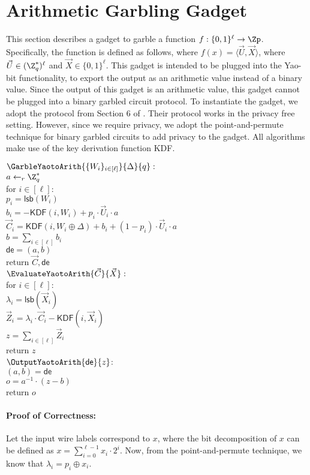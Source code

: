 \section{Arithmetic Garbling Gadget}

This section describes a gadget to garble a function $f: \{0,1\}^\ell \rightarrow \Zp$.  Specifically, the function is defined as follows, where $f(x) = \langle \vec{U}, \vec{X} \rangle$, where $\vec{U} \in (\Z_q^*)^\ell$ and $\vec{X} \in \{0,1\}^\ell$. This gadget is intended to be plugged into the Yao-bit functionality, to export the output as an arithmetic value instead of a binary value. Since the output of this gadget is an arithmetic value, this gadget cannot be plugged into a binary garbled circuit protocol. To instantiate the gadget, we adopt the protocol from Section 6 of \cite{C:GKMN21}. Their protocol works in the privacy free setting. However, since we require privacy, we adopt the point-and-permute technique for binary garbled circuits to add privacy to the gadget. All algorithms make use of the key derivation function
KDF. 

\begin{protocol}
	$\GarbleYaotoArith{\{W_i\}_{i \in [\ell]}}{\Delta}{q}:$ \\
	\indent $a \gets_r \Z_q^*$ \\
	\indent for $i \in [\ell]:$ \\
	\indent \indent $p_i = \mathsf{lsb}(W_i)$ \\
	\indent \indent $b_i = -\mathsf{KDF}(i, W_i) + p_i \cdot \vec{U}_i \cdot a$ \\
	\indent \indent $\vec{C}_i = \mathsf{KDF}(i, W_i \oplus \Delta) + b_i  + (1 - p_i) \cdot \vec{U}_i \cdot a$ \\
	\indent $b = \sum_{i \in [\ell]}b_i$ \\
	\indent $\mathsf{de} = (a, b)$ \\
	\indent return $\vec{C}, \mathsf{de}$ \\
	
	\noindent 
	$\EvaluateYaotoArith{\vec{C}}{\vec{X}}:$ \\
	\indent for $i \in [\ell]$: \\
	\indent \indent $\lambda_i = \mathsf{lsb}(\vec{X}_i)$ \\
	\indent \indent $\vec{Z}_i = \lambda_i \cdot \vec{C}_i - \mathsf{KDF}(i, \vec{X}_i)$ \\
	\indent $z = \sum_{i \in [\ell]}\vec{Z}_i$ \\
	\indent return $z$ \\
	
	\noindent 
	$\OutputYaotoArith{\mathsf{de}}{z}$: \\
	\indent $(a, b) = \mathsf{de}$ \\
	\indent $o = a^{-1} \cdot (z - b)$ \\
	\indent return $o$
\end{protocol}

\paragraph{\bf Proof of Correctness:} Let the input wire labels correspond to $x$, where the bit decomposition of $x$ can be defined as $x = \sum_{i=0}^{\ell - 1}x_i \cdot 2^i$. Now, from the point-and-permute technique, we know that $\lambda_i = p_i \oplus x_i$. 